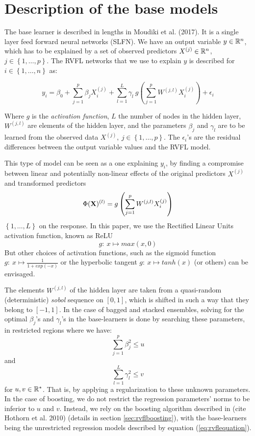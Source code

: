 \section{Description of the base models}
\label{sec:basemodeldesc}

The base learner is described in lengths in Moudiki et al. (2017). It is a single layer feed forward neural networks (SLFN). We have an output variable $y \in \mathbb{R}^n$, which has to be explained by a set of observed predictors $X^{(j)} \in \mathbb{R}^n$, $j \in \left\lbrace 1, \ldots,
p\right\rbrace$. The RVFL networks that we use to explain $y$ is described for $i \in \left\lbrace 1, \ldots, n\right\rbrace$ as:

\begin{equation}
\label{eq:rvflequation}
y_i = \beta_0 + \sum_{j = 1}^p \beta_j X_i^{(j)} + \sum_{l = 1}^L \gamma_l \:
g\left(\sum_{j = 1}^p W^{(j, l)} X_i^{(j)}\right) + \epsilon_i
\end{equation}

\medskip

Where $g$ is the \textit{activation function}, $L$ the number of nodes in the hidden
layer, $W^{(j, l)}$ are elements of the hidden layer, and the parameters
$\beta_j$ and $\gamma_l$ are to be learned from the observed data $X^{(j)}, \: j
\in \left\lbrace 1, \ldots, p\right\rbrace$. The $\epsilon_i$'s are the residual
differences between the output variable values and the RVFL model.

\medskip

This type of model can be seen as a one explaining $y_i$, by finding a
compromise between linear and potentially non-linear effects of the original
predictors $X^{(j)}$ and transformed predictors
$$
\Phi({\bf X})^{(l)}= g\left(\sum_{j = 1}^p W^{(j, l)} X_i^{(j)}\right)
$$
$\left \lbrace 1, \ldots, L\right\rbrace$ on the response. In this paper, we use the Rectified Linear Units activation function, known as ReLU
$$
g: \: x \mapsto max(x, 0)
$$
But other choices of activation functions, such as the sigmoid function $g: \: x \mapsto \frac{1}{1+exp(-x)}$ or the hyperbolic tangent $g: \: x \mapsto tanh(x)$ (or others) can be envisaged.

\medskip

The elements $W^{(j, l)}$ of the hidden layer are taken from a quasi-random (deterministic) \textit{sobol} sequence on $[0, 1]$, which is shifted in such a way that they belong to $[-1, 1]$. In the case of bagged and stacked ensembles, solving for the optimal $\beta_j$'s and $\gamma_l$'s in the base-learners is done by searching these parameters,  in restricted regions where we have:
$$
\sum_{j=1}^p \beta_j^2  \leq u
$$
and
$$
\sum_{l=1}^L
\gamma_l^2 \leq v
$$ for $u, v \in \mathbb{R}^*$. That is, by applying a regularization to these unknown parameters. In the case of boosting, we do not restrict the regression parameters' norms to be inferior to $u$ and $v$. Instead, we rely on the boosting algorithm described in (cite Hothorn et al. 2010) (details in section \ref{sec:rvflboosting}), with the base-learners being the unrestricted regression models described by equation (\ref{eq:rvflequation}). 


